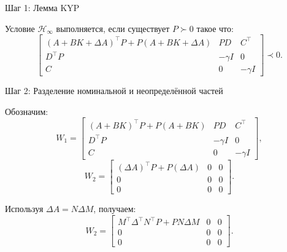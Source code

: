 \documentclass{beamer}
\begin{document}
\begin{frame}{Шаг 1: Лемма KYP}
	\begin{flushleft}
		
		Условие $\mathcal{H}_\infty$ выполняется, если существует $P \succ 0$ такое что:
		\[
		\begin{bmatrix}
			(A + BK + \Delta A)^\top P + P(A + BK + \Delta A) & PD & C^\top \\
			D^\top P & -\gamma I & 0 \\
			C & 0 & -\gamma I
		\end{bmatrix} \prec 0.
		\]
		
		
	\end{flushleft}
\end{frame}


\begin{frame}{Шаг 2: Разделение номинальной и неопределённой частей}
	\begin{flushleft}
		
		
		Обозначим:
		\[
		W_1 =
		\begin{bmatrix}
			(A + BK)^\top P + P(A + BK) & PD & C^\top \\
			D^\top P & -\gamma I & 0 \\
			C & 0 & -\gamma I
		\end{bmatrix},
		\]
		\[
		W_2 =
		\begin{bmatrix}
			(\Delta A)^\top P + P(\Delta A) & 0 & 0 \\
			0 & 0 & 0 \\
			0 & 0 & 0
		\end{bmatrix}.
		\]
		
		Используя $\Delta A = N \Delta M$, получаем:
		\[
		W_2 =
		\begin{bmatrix}
			M^\top \Delta^\top N^\top P + PN \Delta M & 0 & 0 \\
			0 & 0 & 0 \\
			0 & 0 & 0
		\end{bmatrix}.
		\]
		
	\end{flushleft}
\end{frame}
\end{document}
